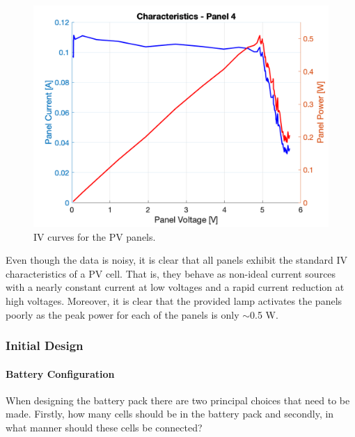 \documentclass[a4paper]{article}
\begin{document}
\begin{figure}[H]
    \includegraphics[scale=0.18]{Panel4.png}
    \caption{IV curves for the PV panels.}
    \label{fig:IV_curve}
\end{figure}

Even though the data is noisy, it is clear that all panels exhibit the 
standard IV characteristics of a PV cell. That is, they behave as 
non-ideal current sources with a nearly constant current at low 
voltages and a rapid current reduction at high voltages\cite{green}. 
Moreover, it is clear that the provided lamp activates the panels poorly 
as the peak power for each of the panels is only $\sim$0.5 W.

\subsubsection{Initial Design}

\paragraph*{Battery Configuration}
When designing the battery pack there are two principal choices that need to be 
made. Firstly, how many cells should be in the battery pack and secondly, in 
what manner should these cells be connected? 
\end{document}
